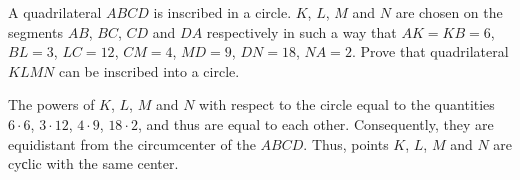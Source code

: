 \problem
A quadrilateral $ABCD$ is inscribed in a circle.
$K$, $L$, $M$ and $N$ are chosen on the segments $AB$, $BC$, $CD$ and $DA$
respectively in such a way that
$AK = KB = 6$, $BL = 3$, $LC = 12$, $CM = 4$, $MD = 9$, $DN = 18$, $NA = 2$.
Prove that quadrilateral $KLMN$ can be inscribed into a circle.

\solution
The powers of $K$, $L$, $M$ and $N$ with respect to the circle equal to the
quantities $6 \cdot 6$, $3 \cdot 12$, $4 \cdot 9$, $18 \cdot 2$, and thus are
equal to each other.
Consequently, they are equidistant from the circumcenter of the $ABCD$.
Thus, points $K$, $L$, $M$ and $N$ are cyсlic with the same center.
\endproblem
